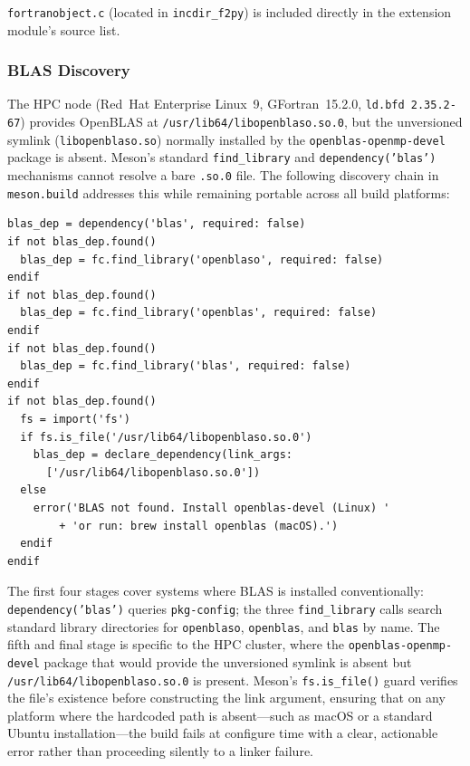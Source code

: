 \documentclass[12pt,a4paper]{article}
\begin{document}
\texttt{fortranobject.c} (located in \texttt{incdir\_f2py}) is included directly in the extension module's source list.

\subsubsection{BLAS Discovery}
\label{sec:phase2-blas}

The HPC node (Red~Hat Enterprise Linux~9, GFortran~15.2.0, \texttt{ld.bfd~2.35.2-67}) provides OpenBLAS at \texttt{/usr/lib64/libopenblaso.so.0}, but the unversioned symlink (\texttt{libopenblaso.so}) normally installed by the \texttt{openblas-openmp-devel} package is absent. Meson's standard \texttt{find\_library} and \texttt{dependency('blas')} mechanisms cannot resolve a bare \texttt{.so.0} file. The following discovery chain in \texttt{meson.build} addresses this while remaining portable across all build platforms:

\begin{lstlisting}[style=shell]
blas_dep = dependency('blas', required: false)
if not blas_dep.found()
  blas_dep = fc.find_library('openblaso', required: false)
endif
if not blas_dep.found()
  blas_dep = fc.find_library('openblas', required: false)
endif
if not blas_dep.found()
  blas_dep = fc.find_library('blas', required: false)
endif
if not blas_dep.found()
  fs = import('fs')
  if fs.is_file('/usr/lib64/libopenblaso.so.0')
    blas_dep = declare_dependency(link_args:
      ['/usr/lib64/libopenblaso.so.0'])
  else
    error('BLAS not found. Install openblas-devel (Linux) '
        + 'or run: brew install openblas (macOS).')
  endif
endif
\end{lstlisting}

The first four stages cover systems where BLAS is installed conventionally: \texttt{dependency('blas')} queries \texttt{pkg-config}; the three \texttt{find\_library} calls search standard library directories for \texttt{openblaso}, \texttt{openblas}, and \texttt{blas} by name. The fifth and final stage is specific to the HPC cluster, where the \texttt{openblas-openmp-devel} package that would provide the unversioned symlink is absent but \texttt{/usr/lib64/libopenblaso.so.0} is present. Meson's \texttt{fs.is\_file()} guard verifies the file's existence before constructing the link argument, ensuring that on any platform where the hardcoded path is absent---such as macOS or a standard Ubuntu installation---the build fails at configure time with a clear, actionable error rather than proceeding silently to a linker failure.
\end{document}
